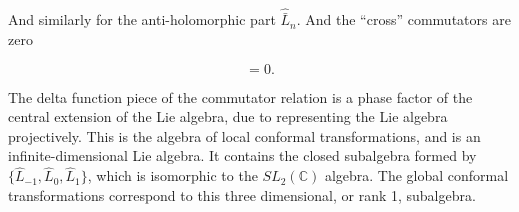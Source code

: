 \noindent And similarly for the anti-holomorphic part $\hat{\bar{L}}_n$. And the ``cross'' commutators are zero

\begin{equation}
[\hat{L}_n, \hat{\bar{L}}_m ] = 0.
\end{equation}

\noindent The delta function piece of the commutator relation is a phase factor of the central extension of the Lie algebra, due to representing the Lie algebra projectively. This is the algebra of local conformal transformations, and is an infinite-dimensional Lie algebra. It contains the closed subalgebra formed by $\{ \hat{L}_{-1}, \hat{L}_0, \hat{L}_1 \}$, which is isomorphic to the $SL_2 (\mathbb{C})$ algebra. The global conformal transformations correspond to this three dimensional, or rank 1, subalgebra.
